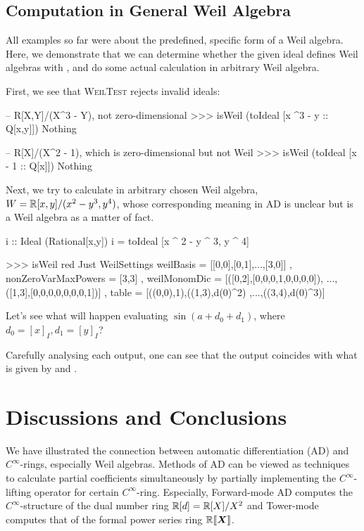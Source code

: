 \documentclass[runningheads]{llncs}
\begin{document}
\subsection{Computation in General Weil Algebra}
All examples so far were about the predefined, specific form of a Weil algebra.
Here, we demonstrate that we can determine whether the given ideal defines Weil algebras with , and do some actual calculation in arbitrary Weil algebra.

First, we see that \textsc{WeilTest} rejects invalid ideals:

\begin{code}
-- R[X,Y]/(X^3 - Y), not zero-dimensional
>>> isWeil (toIdeal [x ^3 - y :: Q[x,y]])
Nothing

-- R[X]/(X^2 - 1), which is zero-dimensional but not Weil
>>> isWeil (toIdeal [x - 1 :: Q[x]])
Nothing
\end{code}

Next, we try to calculate in arbitrary chosen Weil algebra, $W = \mathbb{R}[x,y]/(x^2 - y^3, y^4)$, whose corresponding meaning in AD is unclear but is a Weil algebra as a matter of fact.

\begin{code}
i :: Ideal (Rational[x,y])
i = toIdeal [x ^ 2 - y ^ 3, y ^ 4]

>>> isWeil red
Just WeilSettings 
  {weilBasis =
    [[0,0],[0,1],...,[3,0]]
  , nonZeroVarMaxPowers = [3,3]
  , weilMonomDic = 
    [([0,2],[0,0,0,1,0,0,0,0]),
      ...,([1,3],[0,0,0,0,0,0,0,1])]
  , table = [((0,0),1),((1,3),d(0)^2)
      ,...,((3,4),d(0)^3)]
  }
\end{code}

Let's see what will happen evaluating $\sin(a + d_0 + d_1)$, where $d_0 = [x]_I, d_1 = [y]_I$?


Carefully analysing each output, one can see that the output coincides with what is given by  and .

\section{Discussions and Conclusions}\label{sec:concl}
We have illustrated the connection between automatic differentiation (AD) and $C^\infty$-rings, especially Weil algebras.
Methods of AD can be viewed as techniques to calculate partial coefficients simultaneously by partially implementing the $C^\infty$-lifting operator for certain $C^\infty$-ring.
Especially, Forward-mode AD computes the $C^\infty$-structure of the dual number ring $\mathbb{R}[d] = \mathbb{R}[X]/X^2$ and Tower-mode computes that of the formal power series ring $\mathord{\mathbb{R}\llbracket\boldsymbol{X}\rrbracket}$.
\end{document}
